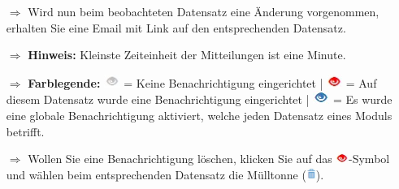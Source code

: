 \documentclass{article}
\begin{document}
\begin{multicols}{2}

\begin{tcolorbox}[colback=blue!5,colframe=blue!40!black,title=Benachrichtigungen erhalten]
\begin{itemize}
  \item[$\Longrightarrow$] Wird nun beim beobachteten Datensatz eine Änderung vorgenommen, erhalten Sie eine Email mit Link auf den entsprechenden Datensatz.
	\item[$\Longrightarrow$] \textbf{Hinweis:} Kleinste Zeiteinheit der Mitteilungen ist eine Minute.
  \item[$\Longrightarrow$] \textbf{Farblegende:} \includegraphics[height=12pt]{Icons/Auge_g.jpg} = Keine Benachrichtigung eingerichtet | \includegraphics[height=12pt]{Icons/Auge_r.jpg} = Auf diesem Datensatz wurde eine Benachrichtigung eingerichtet | \includegraphics[height=12pt]{Icons/Auge_b.jpg} = Es wurde eine globale Benachrichtigung aktiviert, welche jeden Datensatz eines Moduls betrifft.
	  \item[$\Longrightarrow$] Wollen Sie eine Benachrichtigung löschen, klicken Sie auf das \includegraphics[height=10pt]{Icons/Auge_r.jpg}-Symbol und wählen beim entsprechenden Datensatz die Mülltonne (\includegraphics[height=10pt]{Icons/Muelltonne.jpg}). 
\end{itemize}
\end{tcolorbox}





\end{multicols}
\end{document}
